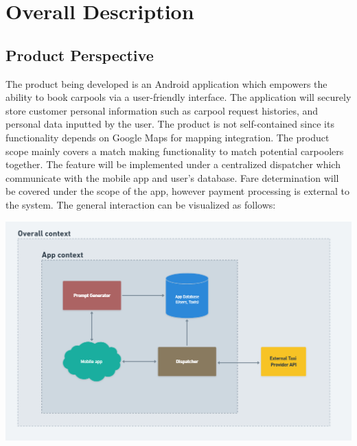 \documentclass[]{article}
\begin{document}

\section{Overall Description}
\label{sec:overall_description}


\subsection{Product Perspective}
\label{sub:product_perspective}

	The product being developed is an Android application which empowers the ability to book carpools via a user-friendly interface. The application will securely store customer personal information such as carpool request histories, and personal data inputted by the user. The product is not self-contained since its functionality depends on Google Maps for mapping integration. The product scope mainly covers a match making functionality to match potential carpoolers together. The feature will be implemented under a centralized dispatcher which communicate with the mobile app and user’s database. Fare determination will be covered under the scope of the app, however payment processing is external to the system. The general interaction can be visualized as follows: 
	\begin{center}
		\includegraphics[scale=0.7]{app-context.png}
	\end{center}


\end{document}
